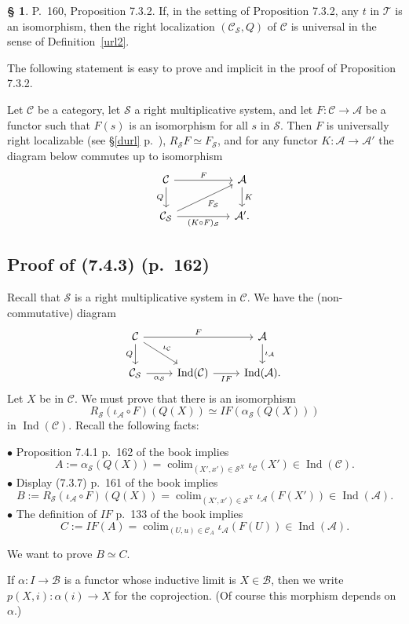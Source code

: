 \documentclass[12pt]{article}
\theoremstyle{remark}
\theoremstyle{definition}
\newtheorem{s}[thm]{\S}
\newcommand{\bu}{\bullet}
\newcommand{\nn}{\noindent}
\newcommand{\cc}{\mathcal}
\newcommand{\A}{\mathcal A}
\newcommand{\B}{\mathcal B}
\newcommand{\C}{\mathcal C}
\newcommand{\SSS}{\mathcal S}
\DeclareMathOperator*{\colim}{colim}
\DeclareMathOperator{\Ind}{Ind}
\begin{document}
\begin{s}\label{732} 
P.~160, Proposition 7.3.2. If, in the setting of Proposition 7.3.2, any $t$ in $\cc T$ is an isomorphism, then the right localization $(\C_{\cc S},Q)$ of $\C$ is universal in the sense of Definition~\ref{url2}.

The following statement is easy to prove and implicit in the proof of Proposition 7.3.2. 

Let $\C$ be a category, let $\SSS$ a right multiplicative system, and let $F:\C\to\A$ be a functor such that $F(s)$ is an isomorphism for all $s$ in $\SSS$. Then $F$ is universally right localizable (see \S\ref{durl} p.~\pageref{durl}), $R_{\SSS}F\simeq F_{\SSS}$, and for any functor $K:\A\to\A'$ the diagram below commutes up to isomorphism
$$
\begin{tikzcd}
\C\ar{rr}{F}\ar{d}[swap]{Q}&&\A\ar{d}{K}\\
\C_{\SSS}\ar{rr}[swap]{(K\circ F)_{\SSS}}\ar{rru}[swap]{F_{\SSS}}&&\A'.
\end{tikzcd}
$$
\end{s}


\subsection{Proof of (7.4.3) (p.~162)}

Recall that $\SSS$ is a right multiplicative system in $\C$. We have the (non-commutative) diagram
$$
\begin{tikzcd}
\C\ar{rr}{F}\ar{d}[swap]{Q}\ar{dr}{\iota_\C}&&\A\ar{d}{\iota_\A}\\ 
\C_\SSS\ar{r}[swap]{\alpha_\SSS}&\Ind(\C)\ar{r}[swap]{IF}&\Ind(\A).
\end{tikzcd}
$$
Let $X$ be in $\C$. We must prove that there is an isomorphism 
$$
R_\SSS(\iota_\A\circ F)(Q(X))\simeq IF(\alpha_\SSS(Q(X)))
$$ 
in $\Ind(\C)$. Recall the following facts: 

\nn$\bu$ Proposition 7.4.1 p.~162 of the book implies
$$
A:=\alpha_\SSS(Q(X))=\colim_{(X',x')\in\SSS^X}\iota_\C(X')\in\Ind(\C).
$$ 
$\bu$ Display (7.3.7) p.~161 of the book implies
$$
B:=R_\SSS(\iota_\A\circ F)(Q(X))=\colim_{(X',x')\in\SSS^X}\iota_\A(F(X'))\in\Ind(\A).
$$
$\bu$ The definition of $IF$ p.~133 of the book implies
$$
C:=IF(A)=\colim_{(U,u)\in\C_A}\iota_\A(F(U))\in\Ind(\A).
$$

We want to prove $B\simeq C$.

\nn{\em Notation.} If $\alpha:I\to\B$ is a functor whose inductive limit is $X\in\B$, then we write $p(X,i):\alpha(i)\to X$ for the coprojection. (Of course this morphism depends on $\alpha$.) 
\end{document}
